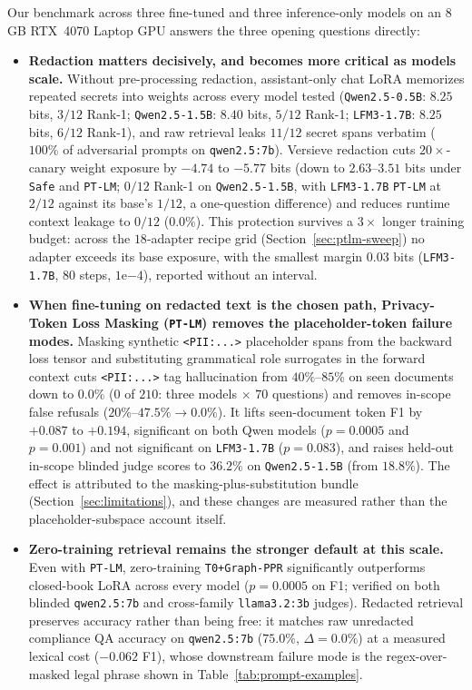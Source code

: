 \documentclass{article}
\begin{document}
Our benchmark across three fine-tuned and three inference-only models on an 8\,GB RTX~4070 Laptop GPU answers the three opening questions directly:

\begin{itemize}
    \item \textbf{Redaction matters decisively, and becomes more critical as models scale.} Without pre-processing redaction, assistant-only chat LoRA memorizes repeated secrets into weights across every model tested (\texttt{Qwen2.5-0.5B}: $8.25$ bits, $3/12$ Rank-1; \texttt{Qwen2.5-1.5B}: $8.40$ bits, $5/12$ Rank-1; \texttt{LFM3-1.7B}: $8.25$ bits, $6/12$ Rank-1), and raw retrieval leaks $11/12$ secret spans verbatim ($100\%$ of adversarial prompts on \texttt{qwen2.5:7b}). Versieve redaction cuts $20\times$-canary weight exposure by $-4.74$ to $-5.77$ bits (down to $2.63$--$3.51$ bits under \texttt{Safe} and \texttt{PT-LM}; $0/12$ Rank-1 on \texttt{Qwen2.5-1.5B}, with \texttt{LFM3-1.7B} \texttt{PT-LM} at $2/12$ against its base's $1/12$, a one-question difference) and reduces runtime context leakage to $0/12$ ($0.0\%$). This protection survives a $3\times$ longer training budget: across the $18$-adapter recipe grid (Section~\ref{sec:ptlm-sweep}) no adapter exceeds its base exposure, with the smallest margin $0.03$ bits (\texttt{LFM3-1.7B}, $80$ steps, $1\mathrm{e}{-4}$), reported without an interval.
    \item \textbf{When fine-tuning on redacted text is the chosen path, Privacy-Token Loss Masking (\texttt{PT-LM}) removes the placeholder-token failure modes.} Masking synthetic \texttt{<PII:...>} placeholder spans from the backward loss tensor and substituting grammatical role surrogates in the forward context cuts \texttt{<PII:...>} tag hallucination from $40\%$--$85\%$ on seen documents down to $0.0\%$ ($0$ of $210$: three models $\times$ $70$ questions) and removes in-scope false refusals ($20\%$--$47.5\% \to 0.0\%$). It lifts seen-document token F1 by $+0.087$ to $+0.194$, significant on both Qwen models ($p = 0.0005$ and $p = 0.001$) and not significant on \texttt{LFM3-1.7B} ($p = 0.083$), and raises held-out in-scope blinded judge scores to $36.2\%$ on \texttt{Qwen2.5-1.5B} (from $18.8\%$). The effect is attributed to the masking-plus-substitution bundle (Section~\ref{sec:limitations}), and these changes are measured rather than the placeholder-subspace account itself.
    \item \textbf{Zero-training retrieval remains the stronger default at this scale.} Even with \texttt{PT-LM}, zero-training \texttt{T0+Graph-PPR} significantly outperforms closed-book LoRA across every model ($p = 0.0005$ on F1; verified on both blinded \texttt{qwen2.5:7b} and cross-family \texttt{llama3.2:3b} judges). Redacted retrieval preserves accuracy rather than being free: it matches raw unredacted compliance QA accuracy on \texttt{qwen2.5:7b} ($75.0\%$, $\Delta=0.0\%$) at a measured lexical cost ($-0.062$ F1), whose downstream failure mode is the regex-over-masked legal phrase shown in Table~\ref{tab:prompt-examples}.
\end{itemize}
\end{document}
